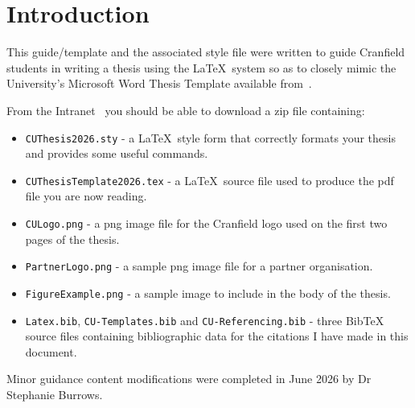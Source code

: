 \documentclass[12pt,oneside]{book} %
\begin{document}
%
%
\mainmatter
\pagestyle{fancy}
\fancyhead[L]{\nouppercase{\leftmark}}
\fancyhead[R]{\nouppercase{\rightmark}}

\chapter{Introduction}
\label{sec:Intro}
This guide/template and the associated style file were written to guide Cranfield students in writing a thesis using the \LaTeX\ system so as to closely mimic the University's Microsoft Word Thesis Template available from~\cite{cranfielduniversityTemplatesThesisEnd2026}.

From the Intranet~\cite{cranfielduniversityTemplatesThesisEnd2026} you should be able to download a zip file containing:
\begin{itemize}
\item \texttt{CUThesis2026.sty} - a \LaTeX\ style form that correctly formats your thesis and provides some useful commands.
\item \texttt{CUThesisTemplate2026.tex} - a \LaTeX\ source file used to produce the pdf file you are now reading.
\item \texttt{CULogo.png} - a png image file for the Cranfield logo used on the first two pages of the thesis.
\item \texttt{PartnerLogo.png} -  a sample png image file for a partner organisation.
\item \texttt{FigureExample.png} - a sample image to include in the body of the thesis.
\item \texttt{Latex.bib}, \texttt{CU-Templates.bib} and \texttt{CU-Referencing.bib} - three BibTeX \linebreak source files containing bibliographic data for the citations I have made in this document.
\end{itemize}

Minor guidance content modifications were completed in June 2026 by Dr Stephanie Burrows.
\end{document}

